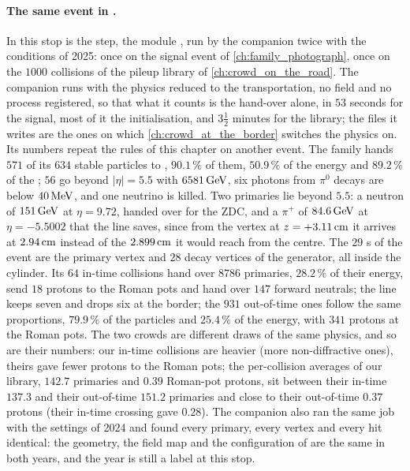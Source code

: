 \paragraph{The same event in \CMSSW.}
\label{sec:crossing_the_border:cmssw_event}
In \CMSSW this stop is the  step, the module ,
run by the companion twice with the conditions of 2025: once on the signal
event of \cref{ch:family_photograph}, once on the $1000$ collisions of the
pileup library of \cref{ch:crowd_on_the_road}. The companion runs \GEANT
with the physics reduced to the transportation, no field and no process
registered, so that what it counts is the hand-over alone, in $53$ seconds
for the signal, most of it the initialisation, and $3\frac12$ minutes for the
library; the files it writes are the ones on which
\cref{ch:crowd_at_the_border} switches the physics on. Its numbers repeat
the rules of this chapter on another event. The family hands $571$ of its
$634$ stable particles to \GEANT, $90.1\,\%$ of them, $50.9\,\%$ of the
energy and $89.2\,\%$ of the \pt; $56$ go beyond $|\eta|=5.5$ with
$6581\,\mathrm{GeV}$, six photons from $\pi^0$ decays are below $40\,\mathrm{MeV}$, and one
neutrino is killed. Two primaries lie beyond $5.5$: a neutron of $151\,\mathrm{GeV}$
at $\eta=9.72$, handed over for the ZDC, and a $\pi^+$ of $84.6\,\mathrm{GeV}$ at
$\eta=-5.5002$ that the line saves, since from the vertex at $z=+3.11\,\mathrm{cm}$ it
arrives at $2.94\,\mathrm{cm}$ instead of the $2.899\,\mathrm{cm}$ it would reach from the
centre. The $29$ s of the event are the primary vertex and
$28$ decay vertices of the generator, all inside the cylinder. Its $64$
in-time collisions hand over $8786$ primaries, $28.2\,\%$ of their energy,
send $18$ protons to the Roman pots and hand over $147$ forward neutrals; the
line keeps seven and drops six at the border; the $931$ out-of-time ones
follow the same proportions, $79.9\,\%$ of the particles and $25.4\,\%$ of
the energy, with $341$ protons at the Roman pots. The two crowds are
different draws of the same physics, and so are their numbers: our in-time
collisions are heavier (more non-diffractive ones), theirs gave fewer
protons to the Roman pots; the per-collision averages of our library,
$142.7$ primaries and $0.39$ Roman-pot protons, sit between their in-time
$137.3$ and their out-of-time $151.2$ primaries and close to their
out-of-time $0.37$ protons (their in-time crossing gave $0.28$). The companion also
ran the same job with the settings of 2024 and found every primary, every
vertex and every hit identical: the geometry, the field map and the
configuration of  are the same in both years, and the
year is still a label at this stop.

